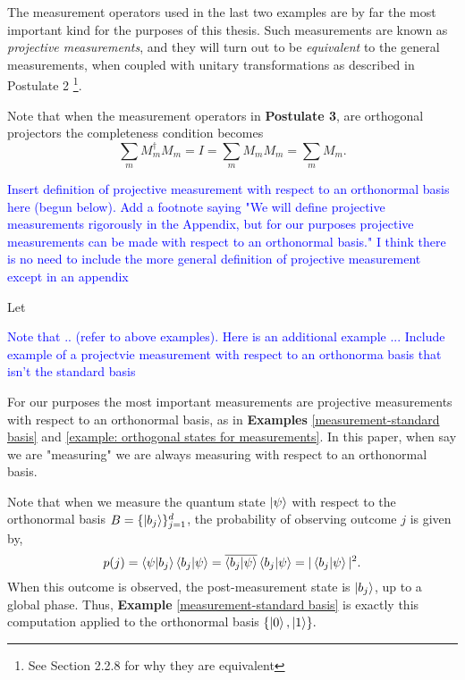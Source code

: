 {%

\label{subsection:projective measurement}
The measurement operators used in the last two examples are by far the most important kind for the purposes of this thesis.  Such measurements are known as \textit{projective measurements}, and they will turn out to be \textit{equivalent} to the general measurements, when coupled with unitary transformations as described in Postulate 2 \footnote{See \cite{Nielsen} Section 2.2.8 for why they are equivalent}. 


Note that when the measurement operators in \textbf{Postulate 3}, are orthogonal projectors the completeness condition becomes
\begin{equation}
\sum\limits_m M_m^\dagger M_m = I = \sum\limits_m M_m M_m = \sum\limits_m M_m.
\end{equation}




\textcolor{blue}{Insert definition of projective measurement with respect to an orthonormal basis here (begun below).  Add a footnote saying "We will define projective measurements rigorously in the Appendix, but for our purposes projective measurements can be made with respect to an orthonormal basis."  I think there is no need to include the more general definition of projective measurement except in an appendix}


\begin{definition}
Let
\end{definition}

\textcolor{blue}{Note that .. (refer to above examples).  Here is an additional example ... Include example of a projectvie measurement with respect to an orthonorma basis that isn't the standard basis}

\begin{example}

\end{example}



For our purposes the most important measurements are projective measurements with respect to an orthonormal basis, as in \textbf{Examples} \ref{measurement-standard basis} and \ref{example: orthogonal states for measurements}.  In this paper, when say we are "measuring" we are always measuring with respect to an orthonormal basis.


Note that when we measure the quantum state $\ket{\psi}$ with respect to the orthonormal basis $B =\{\ket{b_j}\}_{j=1}^d$, the probability of observing outcome $j$ is given by,
 \begin{equation}
 p(j)=\braket{\psi|b_j}\braket{b_j|\psi}= \overline{\braket{b_j|\psi}}\braket{b_j|\psi}= |\braket{b_j|\psi}|^2.
 \end{equation}
 When this outcome is observed, the post-measurement state is $\ket{b_j}$, up to a global phase.  Thus, \textbf{Example} \ref{measurement-standard basis} is exactly this computation applied to the orthonormal basis $\{\ket{0},\ket{1}\}.$
 
}
